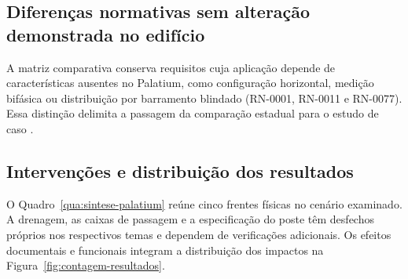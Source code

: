 \subsection{Diferenças normativas sem alteração demonstrada no edifício}

A matriz comparativa conserva requisitos cuja aplicação depende de características ausentes no Palatium, como configuração horizontal, medição bifásica ou distribuição por barramento blindado (RN-0001, RN-0011 e RN-0077). Essa distinção delimita a passagem da comparação estadual para o estudo de caso \cite[seção~1, tabela~8 e item~7.22.9]{enel1580}.

\subsection{Intervenções e distribuição dos resultados}\label{sec:sintese-palatium}

O Quadro~\ref{qua:sintese-palatium} reúne cinco frentes físicas no cenário examinado. A drenagem, as caixas de passagem e a especificação do poste têm desfechos próprios nos respectivos temas e dependem de verificações adicionais. Os efeitos documentais e funcionais integram a distribuição dos impactos na Figura~\ref{fig:contagem-resultados}.

